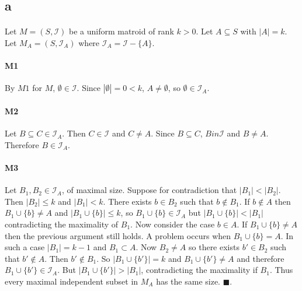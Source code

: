 \documentclass[letterpaper,12pt,oneside,onecolumn]{report}
\begin{document}
\subsection*{a}
\paragraph{}
Let $M = (S,\mathcal{I})$ be a uniform matroid of rank $k > 0$. Let $A \subseteq S$ with $|A| = k$. Let $M_A = (S, \mathcal{I}_A)$ where $\mathcal{I}_A = \mathcal{I} - \{A\}$.
\paragraph{M1}
By $M1$ for $M$, $\emptyset \in \mathcal{I}$. Since $|\emptyset| = 0 < k$, $A \neq \emptyset$, so $\emptyset \in \mathcal{I}_A$.
\paragraph{M2}
Let $B \subseteq C \in \mathcal{I}_A$. Then $C \in \mathcal{I}$ and $C \neq A$. Since $B \subseteq C$, $B in \mathcal{I}$ and $B \neq A$. Therefore $B \in \mathcal{I}_A$.
\paragraph{M3}
Let $B_1, B_2 \in \mathcal{I}_A$, of maximal size. Suppose for contradiction that $|B_1| < |B_2|$. Then $|B_2| \leq k$ and $|B_1| < k$. There exists $b \in B_2$ such that $b \not\in B_1$. If $b \not \in A$ then $B_1 \cup \{b\} \neq A$ and $|B_1 \cup \{b\}| \leq k$, so $B_1 \cup \{b\} \in \mathcal{I}_A$ but $|B_1 \cup \{b\}| < |B_1|$ contradicting the maximality of $B_1$. Now consider the case $b \in A$. If $B_1 \cup \{b\} \neq A$ then the previous argument still holds. A problem occurs when $B_1 \cup \{b\} = A$. In such a case $|B_1| = k-1$ and $B_1 \subset A$. Now $B_2 \neq A$ so there exists $b' \in B_2$ such that $b' \not\in A$. Then $b' \not\in B_1$. So $|B_1 \cup \{b'\}| = k$ and $B_1 \cup \{b'\} \neq A$ and therefore $B_1 \cup \{b'\} \in \mathcal{I}_A$. But $|B_1 \cup \{b'\}| > |B_1|$, contradicting the maximality if $B_1$. Thus every maximal independent subset in $M_A$ has the same size. $\blacksquare$.
\end{document}
